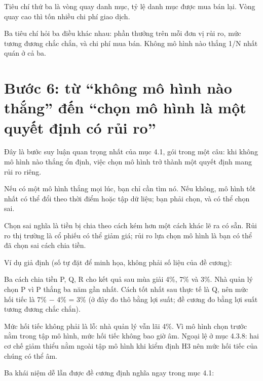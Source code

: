 Tiêu chí thứ ba là vòng quay danh mục, tỷ lệ danh mục được mua bán lại. Vòng quay cao thì tốn nhiều chi phí giao dịch.

Ba tiêu chí hỏi ba điều khác nhau: phần thưởng trên mỗi đơn vị rủi ro, mức tương đương chắc chắn, và chi phí mua bán. Không mô hình nào thắng 1/N nhất quán ở cả ba.

\section{Bước 6: từ “không mô hình nào thắng” đến “chọn mô hình là một quyết định có rủi ro”}

Đây là bước suy luận quan trọng nhất của mục 4.1, gói trong một câu: khi không mô hình nào thắng ổn định, việc chọn mô hình trở thành một quyết định mang rủi ro riêng.

Nếu có một mô hình thắng mọi lúc, bạn chỉ cần tìm nó. Nếu không, mô hình tốt nhất có thể đổi theo thời điểm hoặc tập dữ liệu; bạn phải chọn, và có thể chọn sai.

Chọn sai nghĩa là tiền bị chia theo cách kém hơn một cách khác lẽ ra có sẵn. Rủi ro thị trường là cổ phiếu có thể giảm giá; rủi ro lựa chọn mô hình là bạn có thể đã chọn sai cách chia tiền.

\begin{tcolorbox}[breakable]
Ví dụ giả định (số tự đặt để minh họa, không phải số liệu của đề cương):

Ba cách chia tiền P, Q, R cho kết quả sau mùa giải 4\%, 7\% và 3\%. Nhà quản lý chọn P vì P thắng ba năm gần nhất. Cách tốt nhất sau thực tế là Q, nên mức hối tiếc là 7\% − 4\% = 3\% (ở đây đo thô bằng lợi suất; đề cương đo bằng lợi suất tương đương chắc chắn).
\end{tcolorbox}

Mức hối tiếc không phải là lỗ: nhà quản lý vẫn lãi 4\%. Vì mô hình chọn trước nằm trong tập mô hình, mức hối tiếc không bao giờ âm. Ngoại lệ ở mục 4.3.8: hai cơ chế giảm thiểu nằm ngoài tập mô hình khi kiểm định H3 nên mức hối tiếc của chúng có thể âm.

Ba khái niệm dễ lẫn được đề cương định nghĩa ngay trong mục 4.1:


